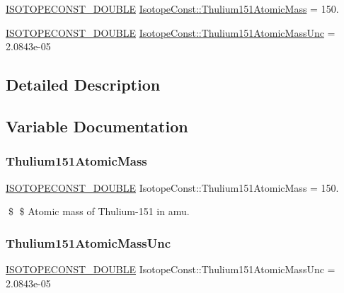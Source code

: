 \begin{DoxyCompactItemize}
\item 
\mbox{\hyperlink{group___isotope_const-_macros_ga8f45a7272ce02c0b4c65c44636ed719a}{I\+S\+O\+T\+O\+P\+E\+C\+O\+N\+S\+T\+\_\+\+D\+O\+U\+B\+LE}} \mbox{\hyperlink{group___isotope_const-_thulium-_tm151_ga8df6606b0ccbc3874b4b5859ebaf0a42}{Isotope\+Const\+::\+Thulium151\+Atomic\+Mass}} = 150.
\item 
\mbox{\hyperlink{group___isotope_const-_macros_ga8f45a7272ce02c0b4c65c44636ed719a}{I\+S\+O\+T\+O\+P\+E\+C\+O\+N\+S\+T\+\_\+\+D\+O\+U\+B\+LE}} \mbox{\hyperlink{group___isotope_const-_thulium-_tm151_ga40addfeca8d9daefae2f8fafea7e0ef9}{Isotope\+Const\+::\+Thulium151\+Atomic\+Mass\+Unc}} = 2.\+0843e-\/05
\end{DoxyCompactItemize}


\subsection{Detailed Description}


\subsection{Variable Documentation}
\mbox{\label{group___isotope_const-_thulium-_tm151_ga8df6606b0ccbc3874b4b5859ebaf0a42}} 
\subsubsection{\texorpdfstring{Thulium151\+Atomic\+Mass}{Thulium151AtomicMass}}
{\footnotesize\ttfamily \mbox{\hyperlink{group___isotope_const-_macros_ga8f45a7272ce02c0b4c65c44636ed719a}{I\+S\+O\+T\+O\+P\+E\+C\+O\+N\+S\+T\+\_\+\+D\+O\+U\+B\+LE}} Isotope\+Const\+::\+Thulium151\+Atomic\+Mass = 150.}

\$ \$ Atomic mass of Thulium-\/151 in amu. \mbox{\label{group___isotope_const-_thulium-_tm151_ga40addfeca8d9daefae2f8fafea7e0ef9}} 
\subsubsection{\texorpdfstring{Thulium151\+Atomic\+Mass\+Unc}{Thulium151AtomicMassUnc}}
{\footnotesize\ttfamily \mbox{\hyperlink{group___isotope_const-_macros_ga8f45a7272ce02c0b4c65c44636ed719a}{I\+S\+O\+T\+O\+P\+E\+C\+O\+N\+S\+T\+\_\+\+D\+O\+U\+B\+LE}} Isotope\+Const\+::\+Thulium151\+Atomic\+Mass\+Unc = 2.\+0843e-\/05}

